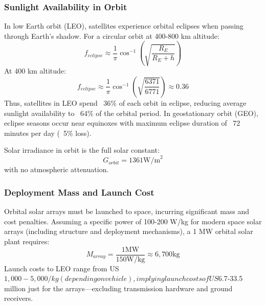 \subsubsection{Sunlight Availability in Orbit}
In low Earth orbit (LEO), satellites experience orbital eclipses when passing through Earth's shadow. For a circular orbit at 400-800 km altitude:
\begin{equation}
f_{eclipse} \approx \frac{1}{\pi} \cos^{-1}\left(\sqrt{\frac{R_E}{R_E + h}}\right)
\end{equation}
At 400 km altitude:
\begin{equation}
f_{eclipse} \approx \frac{1}{\pi} \cos^{-1}\left(\sqrt{\frac{6371}{6771}}\right) \approx 0.36
\end{equation}
Thus, satellites in LEO spend ~36\% of each orbit in eclipse, reducing average sunlight availability to ~64\% of the orbital period. In geostationary orbit (GEO), eclipse seasons occur near equinoxes with maximum eclipse duration of ~72 minutes per day (~5\% loss).

Solar irradiance in orbit is the full solar constant:
\begin{equation}
G_{orbit} = 1361  \text{W/m}^2
\end{equation}
with no atmospheric attenuation.

\subsubsection{Deployment Mass and Launch Cost}
Orbital solar arrays must be launched to space, incurring significant mass and cost penalties. Assuming a specific power of 100-200 W/kg for modern space solar arrays (including structure and deployment mechanisms), a 1 MW orbital solar plant requires:
\begin{equation}
M_{array} = \frac{1  \text{MW}}{150  \text{W/kg}} \approx 6,700  \text{kg}
\end{equation}
Launch costs to LEO range from US$1,000-5,000/kg (depending on vehicle), implying launch costs of US$6.7-33.5 million just for the arrays—excluding transmission hardware and ground receivers.

